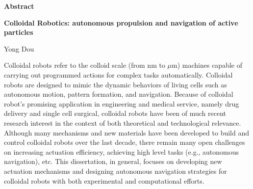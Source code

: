 

\begin{titlepage}
\begin{center}

\textbf{\large Abstract}

\textbf{Colloidal Robotics: autonomous propulsion and navigation of active particles}

Yong Dou
\end{center}

\hspace{5mm}Colloidal robots refer to the colloid scale (from nm to $\mu$m) machines capable of carrying out programmed actions for complex tasks automatically.   Colloidal robots are designed to mimic the dynamic behaviors of living cells such as autonomous motion, pattern formation, and navigation. Because of colloidal robot's promising application in engineering and medical service, namely drug delivery and single cell surgical, colloidal robots have been of much recent research interest in the context of both theoretical and technological relevance. Although many mechanisms and new materials have been developed to build and control colloidal robots over the last decade, there remain many open challenges on increasing actuation efficiency, achieving high level tasks (e.g., autonomous navigation), etc. This dissertation, in general, focuses on developing new actuation mechanisms and designing  autonomous navigation strategies for colloidal robots with both experimental and computational efforts.


\end{titlepage}
